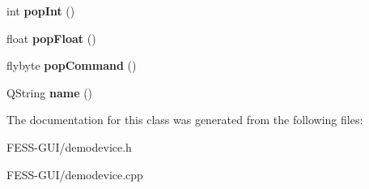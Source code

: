 \begin{DoxyCompactItemize}
\hypertarget{class_demo_device_a69f90f468dc4ff767b74f6fd90ad6b65}{}\label{class_demo_device_a69f90f468dc4ff767b74f6fd90ad6b65} 
int {\bfseries pop\+Int} ()
\item 
\hypertarget{class_demo_device_afc2d0b3c5f039337057b009919db6942}{}\label{class_demo_device_afc2d0b3c5f039337057b009919db6942} 
float {\bfseries pop\+Float} ()
\item 
\hypertarget{class_demo_device_a5900309bc171514b76b94e646474cde7}{}\label{class_demo_device_a5900309bc171514b76b94e646474cde7} 
flybyte {\bfseries pop\+Command} ()
\item 
\hypertarget{class_demo_device_acde538bd5a71a8d4df6293876169545c}{}\label{class_demo_device_acde538bd5a71a8d4df6293876169545c} 
Q\+String {\bfseries name} ()
\end{DoxyCompactItemize}


The documentation for this class was generated from the following files\+:\begin{DoxyCompactItemize}
\item 
F\+E\+S\+S-\/\+G\+U\+I/demodevice.\+h\item 
F\+E\+S\+S-\/\+G\+U\+I/demodevice.\+cpp\end{DoxyCompactItemize}
